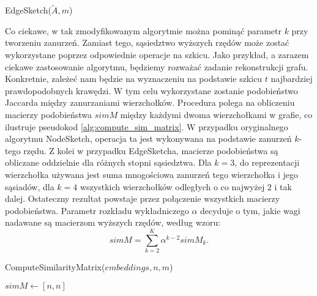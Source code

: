     \begin{algorithm}
        \caption{EdgeSketch($\tilde{A},m$)}\label{alg:edge_sketch}
    \end{algorithm}

    Co ciekawe, w tak zmodyfikowanym algorytmie można pominąć parametr $k$ przy tworzeniu zanurzeń. Zamiast tego, sąsiedztwo wyższych rzędów może zostać wykorzystane poprzez odpowiednie operacje na szkicu. Jako przykład, a zarazem ciekawe zastosowanie algorytmu, będziemy rozważać zadanie rekonstrukcji grafu. Konkretnie, zależeć nam będzie na wyznaczeniu na podstawie szkicu $t$ najbardziej prawdopodobnych krawędzi. W tym celu wykorzystane zostanie podobieństwo Jaccarda między zanurzaniami wierzchołków. Procedura polega na obliczeniu macierzy podobieństwa $simM$ między każdymi dwoma wierzchołkami w grafie, co ilustruje pseudokod \ref{alg:compute_sim_matrix}. W przypadku oryginalnego algorytmu NodeSketch, operacja ta jest wykonywana na podstawie zanurzeń $k$-tego rzędu. Z kolei w przypadku EdgeSketcha, macierze podobieństwa są obliczane oddzielnie dla różnych stopni sąsiedztwa. Dla $k = 3$, do reprezentacji wierzchołka używana jest suma mnogościowa zanurzeń tego wierzchołka i jego sąsiadów, dla $k = 4$ wszystkich wierzchołków odległych o co najwyżej $2$ i tak dalej. Ostateczny rezultat powstaje przez połączenie wszystkich macierzy podobieństwa. Parametr rozkładu wykładniczego $\alpha$ decyduje o tym, jakie wagi nadawane są macierzom wyższych rzędów, według wzoru:
    \begin{equation}  \label{eq:sim_matrix}  
        simM = \sum\limits_{k = 2}^{K} \alpha^{k-2} simM_{k}.
    \end{equation}
    
    \begin{algorithm}
        \caption{ComputeSimilarityMatrix($embeddings, n, m$)}\label{alg:compute_sim_matrix}
        $simM \gets [n,n]$ 
    \end{algorithm}
